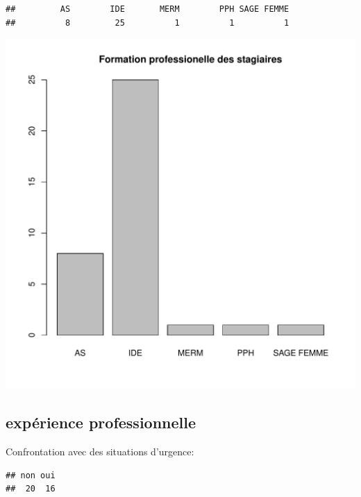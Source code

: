 \documentclass[12pt,english,french]{article}\usepackage{graphicx, color}
\makeatletter
\def\maxwidth{ %
  \ifdim\Gin@nat@width>\linewidth
    \linewidth
  \else
    \Gin@nat@width
  \fi
}
\newenvironment{kframe}{%
 \def\at@end@of@kframe{}%
 \ifinner\ifhmode%
  \def\at@end@of@kframe{\end{minipage}}%
  \begin{minipage}{\columnwidth}%
 \fi\fi%
 \def\FrameCommand##1{\hskip\@totalleftmargin \hskip-\fboxsep
 \colorbox{shadecolor}{##1}\hskip-\fboxsep
     \hskip-\linewidth \hskip-\@totalleftmargin \hskip\columnwidth}%
 \MakeFramed {\advance\hsize-\width
   \@totalleftmargin\z@ \linewidth\hsize
   \@setminipage}}%
 {\par\unskip\endMakeFramed%
 \at@end@of@kframe}
\newenvironment{knitrout}{}{} %
\makeatother
\begin{document}
\begin{knitrout}
\color{fgcolor}\begin{kframe}
\begin{verbatim}
##         AS        IDE       MERM        PPH SAGE FEMME 
##          8         25          1          1          1
\end{verbatim}
\end{kframe}
\includegraphics[width=\maxwidth]{figure/formation} 

\end{knitrout}


\subsection{expérience professionnelle}

Confrontation avec des situations d'urgence:
\begin{knitrout}
\color{fgcolor}\begin{kframe}
\begin{verbatim}
## non oui 
##  20  16
\end{verbatim}
\end{kframe}
\end{knitrout}
\end{document}
